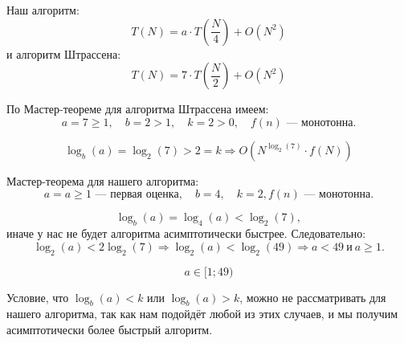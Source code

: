 \documentclass[12pt]{article}
\begin{document}
Наш алгоритм:
\[
T(N) = a \cdot T\left(\frac{N}{4}\right) + O(N^2)
\]
и алгоритм Штрассена:
\[
T(N) = 7 \cdot T\left(\frac{N}{2}\right) + O(N^2)
\]

По Мастер-теореме для алгоритма Штрассена имеем:
\[
a = 7 \ge 1, \quad b = 2 > 1, \quad k = 2 > 0, \quad f(n) \text{ --- монотонна.}
\]

\[
\log_b(a) = \log_2(7) > 2 = k \Rightarrow O(N^{\log_2(7)} \cdot f(N))
\]

Мастер-теорема для нашего алгоритма:
\[
a = a \ge 1 \text{ --- первая оценка}, \quad b = 4, \quad k = 2, f(n) \text{ --- монотонна.}
\]
 
\[
\log_b(a) = \log_4(a) < \log_2(7),
\]
иначе у нас не будет алгоритма асимптотически быстрее. Следовательно:
\[
\log_2(a) < 2\log_2(7) \Rightarrow \log_2(a) < \log_2(49) \Rightarrow a < 49 \ \text{и} \ a \ge 1.
\]

\[
\boxed{a \in [1; 49)}
\]

Условие, что \(\log_b(a) < k\) или \(\log_b(a) > k\), можно не рассматривать для нашего алгоритма, так как нам подойдёт любой из этих случаев, и мы получим асимптотически более быстрый алгоритм.
\end{document}
